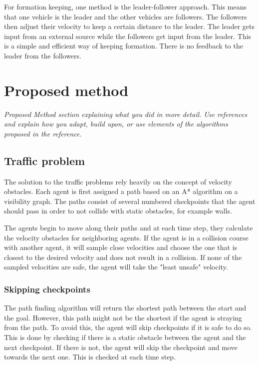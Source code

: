 \documentclass[a4paper,12pt]{article}
\begin{document}
\begin{multicols}{2}
For formation keeping, one method is the leader-follower approach. This means that one vehicle is the leader and the other vehicles are followers. The followers then adjust their velocity to keep a certain distance to the leader. The leader gets input from an external source while the followers get input from the leader. This is a simple and efficient way of keeping formation. There is no feedback to the leader from the followers. \cite{9214872}


\section{Proposed method}
\label{sec:method}
\emph{Proposed Method section explaining what you did in more detail. Use references and explain how you adapt, build upon, or use elements of the algorithms proposed in the reference.}

\subsection*{Traffic problem}

The solution to the traffic problems rely heavily on the concept of velocity obstacles. Each agent is first assigned a path based on an A* algorithm on a visibility graph. The paths consist of several numbered checkpoints that the agent should pass in order to not collide with static obstacles, for example walls.

The agents begin to move along their paths and at each time step, they calculate the velocity obstacles for neighboring agents. If the agent is in a collision course with another agent, it will sample close velocities and choose the one that is closest to the desired velocity and does not result in a collision. If none of the sampled velocities are safe, the agent will take the "least unsafe" velocity.

\subsubsection*{Skipping checkpoints}
The path finding algorithm will return the shortest path between the start and the goal. However, this path might not be the shortest if the agent is straying from the path. To avoid this, the agent will skip checkpoints if it is safe to do so. This is done by checking if there is a static obstacle between the agent and the next checkpoint. If there is not, the agent will skip the checkpoint and move towards the next one. This is checked at each time step.


\end{multicols}
\end{document}

